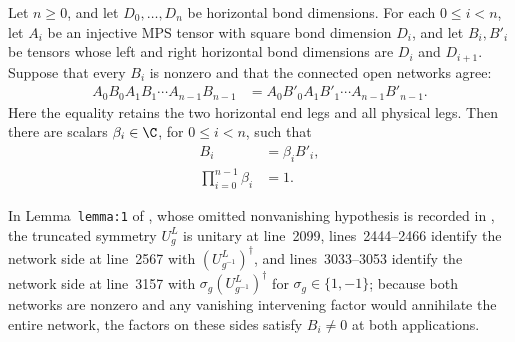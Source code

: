 \begin{lemma}
    \label{thm:mpug_alternating_network_nondegenerate}
    \leanok
    Let $n\geq 0$, and let $D_0,\ldots,D_n$ be horizontal bond dimensions.
    For each $0\leq i<n$, let $A_i$ be an injective MPS tensor with square bond
    dimension $D_i$, and let $B_i,B'_i$ be tensors whose left and right
    horizontal bond dimensions are $D_i$ and $D_{i+1}$.  Suppose that every
    $B_i$ is nonzero and that the connected open networks agree:
    \begin{align}
        A_0B_0A_1B_1\cdots A_{n-1}B_{n-1}
         & =A_0B'_0A_1B'_1\cdots A_{n-1}B'_{n-1}.
        \label{eq:mpug_alternating_network_equality}
    \end{align}
    Here the equality retains the two horizontal end legs and all physical
    legs.  Then there are scalars $\beta_i\in\C$, for $0\leq i<n$, such that
    \begin{align}
        B_i                      & =\beta_iB'_i,
        \label{eq:mpug_alternating_network_proportionality} \\
        \prod_{i=0}^{n-1}\beta_i & =1.
        \label{eq:mpug_alternating_network_scalar_product}
    \end{align}

    In Lemma~\texttt{lemma:1} of
    \cite[lines~2296--2395]{FrancoRubio2025MPUGauging}, whose omitted
    nonvanishing hypothesis is recorded in
    \cite{gap:fbc25_alternating_network_nondegeneracy}, the truncated symmetry
    $U^L_g$ is unitary at line~2099, lines~2444--2466 identify the network side
    at line~2567 with $(U^L_{g^{-1}})^\dagger$, and lines~3033--3053 identify
    the network side at line~3157 with $\sigma_g(U^L_{g^{-1}})^\dagger$ for
    $\sigma_g\in\{1,-1\}$; because both networks are nonzero and any vanishing
    intervening factor would annihilate the entire network, the factors on
    these sides satisfy $B_i\ne 0$ at both applications.
\end{lemma}

